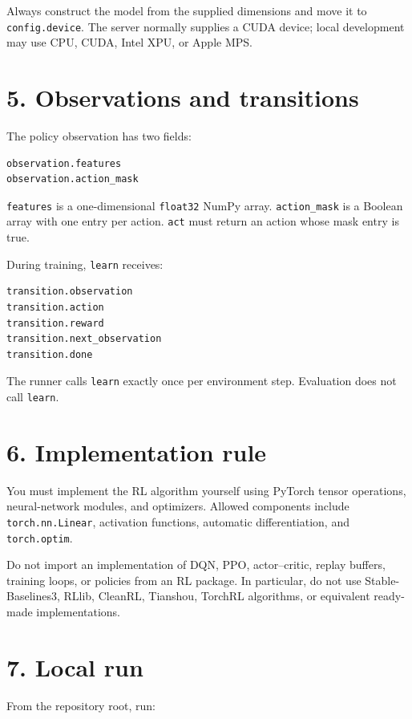 \documentclass[12pt]{report}
\begin{document}
Always construct the model from the supplied dimensions and move it to
\texttt{config.device}. The server normally supplies a CUDA device; local
development may use CPU, CUDA, Intel XPU, or Apple MPS.

\section*{5. Observations and transitions}

The policy observation has two fields:

\begin{verbatim}
observation.features
observation.action_mask
\end{verbatim}

\texttt{features} is a one-dimensional \texttt{float32} NumPy array.
\texttt{action\_mask} is a Boolean array with one entry per action.
\texttt{act} must return an action whose mask entry is true.

During training, \texttt{learn} receives:

\begin{verbatim}
transition.observation
transition.action
transition.reward
transition.next_observation
transition.done
\end{verbatim}

The runner calls \texttt{learn} exactly once per environment step. Evaluation
does not call \texttt{learn}.

\section*{6. Implementation rule}

You must implement the RL algorithm yourself using PyTorch tensor operations,
neural-network modules, and optimizers. Allowed components include
\texttt{torch.nn.Linear}, activation functions, automatic differentiation, and
\texttt{torch.optim}.

Do not import an implementation of DQN, PPO, actor--critic, replay buffers,
training loops, or policies from an RL package. In particular, do not use
Stable-Baselines3, RLlib, CleanRL, Tianshou, TorchRL algorithms, or equivalent
ready-made implementations.

\section*{7. Local run}

From the repository root, run:
\end{document}
